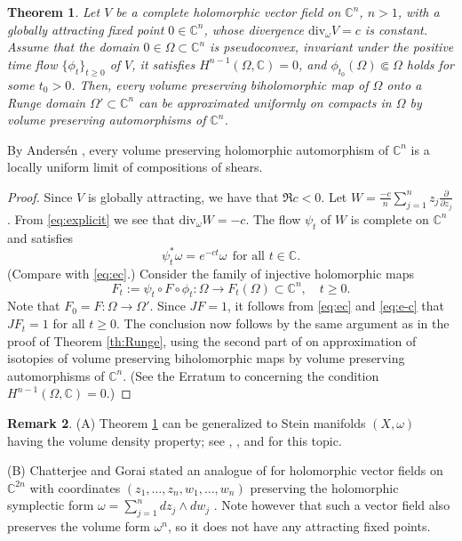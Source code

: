 \documentclass[12pt]{amsart}
\newtheorem{theorem}{Theorem}[section]
\theoremstyle{definition}
\newtheorem{remark}[theorem]{Remark}
\numberwithin{equation}{section}
\numberwithin{figure}{section}
\newcommand\C{\mathbb{C}}
\newcommand\di{\partial}
\renewcommand\div{\mathrm{div}}
\numberwithin{equation}{section}
\begin{document}
%
%
\begin{theorem}\label{th:Runge-volume}
Let $V$ be a complete holomorphic vector field 
on $\C^n$, $n>1$, with a globally attracting fixed point $0\in \C^n$,  
whose divergence $\div_\omega V=c$ is constant. 
Assume that the domain $0\in \Omega\subset \C^n$
is pseudoconvex, invariant under the positive time flow 
$\{\phi_t\}_{t\ge 0}$ of $V$, it satisfies $H^{n-1}(\Omega,\C)=0$, and 
$\phi_{t_0}(\Omega)\Subset \Omega$ holds for some $t_0>0$. 
Then, every volume preserving biholomorphic map 
of $\Omega$ onto a Runge domain $\Omega'\subset \C^n$ 
can be approximated uniformly on compacts in $\Omega$ 
by volume preserving automorphisms of $\C^n$.
\end{theorem}

By Anders\'en \cite{Andersen1990}, 
every volume preserving holomorphic automorphism of $\C^n$
is a locally uniform limit of compositions of shears.

\begin{proof}
Since $V$ is globally attracting, we have that $\Re c<0$.
Let $W= \frac{-c}{n} \sum_{j=1}^n z_j \frac{\di}{\di z_j}$.
From \eqref{eq:explicit} we see that $\div_\omega W =-c$. 
The flow $\psi_t$ of $W$ is complete on $\C^n$ and satisfies 
\begin{equation} \label{eq:e-c}
	\psi_t^*\omega=e^{-ct}\omega\ \ \text{for all $t\in\C$}.  
\end{equation}
(Compare with \eqref{eq:ec}.) 
Consider the family of injective holomorphic maps 
\[
	F_t := \psi_t \circ F \circ \phi_t:
	\Omega\to F_t(\Omega)\subset\C^n,
	\quad t\ge 0.
\]
Note that $F_0=F:\Omega\to\Omega'$. Since 
$JF=1$, it follows from \eqref{eq:ec} and \eqref{eq:e-c} 
that $JF_t=1$ for all $t\ge 0$. The conclusion now follows by 
the same argument as in the proof 
of Theorem \ref{th:Runge}, using the second part
of \cite[Theorem 1.1]{ForstnericRosay1993} on 
approximation of isotopies of volume preserving biholomorphic 
maps by volume preserving automorphisms of $\C^n$.
(See the Erratum to \cite{ForstnericRosay1993} 
concerning the condition $H^{n-1}(\Omega,\C)=0$.)
\end{proof}


%
%
\begin{remark}
(A) Theorem \ref{th:Runge-volume} can be generalized to 
Stein manifolds $(X,\omega)$ having the volume density property; 
see \cite{Varolin2000}, \cite{ForstnericKutzschebauch2022},
and \cite[Sect.\ 4.10]{Forstneric2017E} for this topic.

(B) Chatterjee and Gorai stated an analogue of   
\cite[V5, Theorem 1.5]{ChatterjeeGorai2025X} for holomorphic
vector fields on $\C^{2n}$ with coordinates 
$(z_1,\ldots,z_n,w_1,\ldots,w_n)$ preserving the 
holomorphic symplectic form $\omega=\sum_{j=1}^n dz_j\wedge dw_j$ 
\cite[V5, Theorem 1.10 (ii)]{ChatterjeeGorai2025X}. 
Note however that such a vector field also preserves
the volume form $\omega^n$, 
so it does not have any attracting fixed points.
\end{remark}
\end{document}
